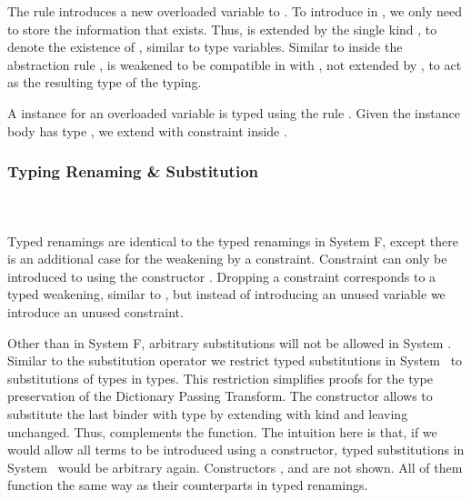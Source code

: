 \noindent The rule  introduces a new overloaded variable  to . 
To introduce  in , we only need to store the information that  exists. Thus,  is extended by the single kind , to denote the existence of , similar to type variables. Similar to  inside the abstraction rule , is weakened to be compatible in  with , not extended by , to act as the resulting type of the typing.

\noindent A instance for an overloaded variable  is typed using the rule . Given the instance body  has type , we extend  with constraint  \Constr{:}  inside . 

\subsubsection{Typing Renaming \& Substitution}\hfill\\\\
Typed renamings are identical to the typed renamings in System F, except there is an additional case for the weakening by a constraint. 
\FoRenTyping
Constraint  \Constr{:}  can only be introduced to  using the constructor . 
Dropping a constraint corresponds to a typed weakening, similar to , but instead of introducing an unused variable we introduce an unused constraint.

\noindent Other than in System F, arbitrary substitutions will not be allowed in System \Fo. 
Similar to the substitution operator we restrict typed substitutions in System \Fo\ to substitutions of types in types. This restriction simplifies proofs for the type preservation of the Dictionary Passing Transform.
\FoSubTyping
\noindent The constructor  allows to substitute the last binder with type  by extending  with kind  and leaving  unchanged.
Thus,  complements the  function. The intuition here is that, if we would allow all terms to be introduced using a  constructor, typed substitutions in System \Fo\ would be arbitrary again.
Constructors ,  and are not shown. All of them function the same way as their counterparts in typed renamings.